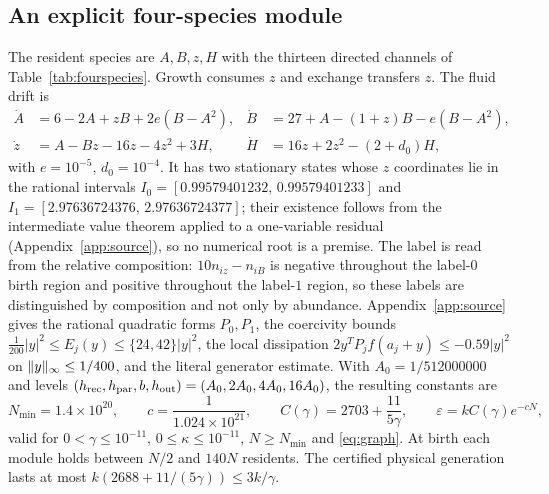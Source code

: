 \subsection{An explicit four-species module}\label{sec:fourspecies}
The resident species are $A,B,z,H$ with the thirteen directed channels of Table~\ref{tab:fourspecies}. Growth consumes $z$ and exchange transfers $z$. The fluid drift is
\begin{equation}\label{eq:fluid}
\begin{aligned}
 \dot A&=6-2A+zB+2e(B-A^2),&\dot B&=27+A-(1+z)B-e(B-A^2),\\
 \dot z&=A-Bz-16z-4z^2+3H,&\dot H&=16z+2z^2-(2+d_0)H,
\end{aligned}
\end{equation}
with $e=10^{-5}$, $d_0=10^{-4}$. It has two stationary states whose $z$ coordinates lie in the rational intervals $I_0=[0.99579401232,\,0.99579401233]$ and $I_1=[2.97636724376,\,2.97636724377]$; their existence follows from the intermediate value theorem applied to a one-variable residual (Appendix~\ref{app:source}), so no numerical root is a premise. The label is read from the relative composition: $10n_{iz}-n_{iB}$ is negative throughout the label-$0$ birth region and positive throughout the label-$1$ region, so these labels are distinguished by composition and not only by abundance. Appendix~\ref{app:source} gives the rational quadratic forms $P_0,P_1$, the coercivity bounds $\frac1{200}|y|^2\le E_j(y)\le\{24,42\}|y|^2$, the local dissipation $2y^TP_jf(a_j+y)\le-0.59|y|^2$ on $\lVert y\rVert_\infty\le1/400$, and the literal generator estimate. With $A_0=1/512000000$ and levels $(h_{\rm rec},h_{\rm par},b,h_{\rm out})=(A_0,2A_0,4A_0,16A_0)$, the resulting constants are
\begin{equation}\label{eq:constants}
 N_{\min}=1.4\times10^{20},\qquad c=\frac1{1.024\times10^{21}},\qquad C(\gamma)=2703+\frac{11}{5\gamma},\qquad
 \varepsilon=kC(\gamma)e^{-cN},
\end{equation}
valid for $0<\gamma\le10^{-11}$, $0\le\kappa\le10^{-11}$, $N\ge N_{\min}$ and \eqref{eq:graph}. At birth each module holds between $N/2$ and $140N$ residents. The certified physical generation lasts at most $k(2688+11/(5\gamma))\le3k/\gamma$.

